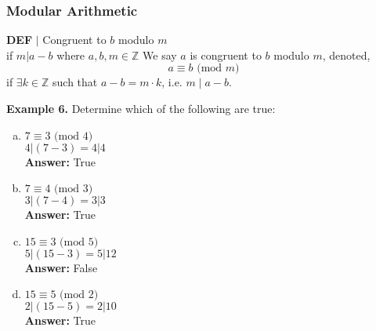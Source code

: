 \documentclass [12pt]{article}
\begin{document}
\subsubsection*{Modular Arithmetic}
\begin{framed}
\textbf{DEF} $|$ Congruent to $b$ modulo $m$\\
\vspace{0.5cm}
if $m|a-b$ where $a,b,m\in\mathbb{Z}$
We say $a$ is congruent to $b$ modulo $m$, denoted,
\[a \equiv b \text{ (mod }m)\]
if $\exists k \in \mathbb{Z}$ such that $a - b = m \cdot k$, i.e. $m\;|\; a - b$.\\
\end{framed}
\raggedright
\textbf{Example 6.} Determine which of the following are true:
\begin{multicols}{2}
\begin{enumerate}[(a)]
\item $7 \equiv 3 \text{ (mod }4)$\\
\quad $4|(7-3) = 4|4$\\
\quad\textbf{Answer:} True
\item $7 \equiv 4 \text{ (mod }3)$\\
\quad $3|(7-4) = 3|3$\\
\quad\textbf{Answer:} True
\item $15 \equiv 3 \text{ (mod }5)$\\
\quad $5|(15-3) = 5|12$\\
\quad\textbf{Answer:} False
\item $15 \equiv 5 \text{ (mod }2)$\\
\quad $2|(15-5) = 2|10$\\
\quad\textbf{Answer:} True
\end{enumerate}
\end{multicols}
\pagebreak
\end{document}
